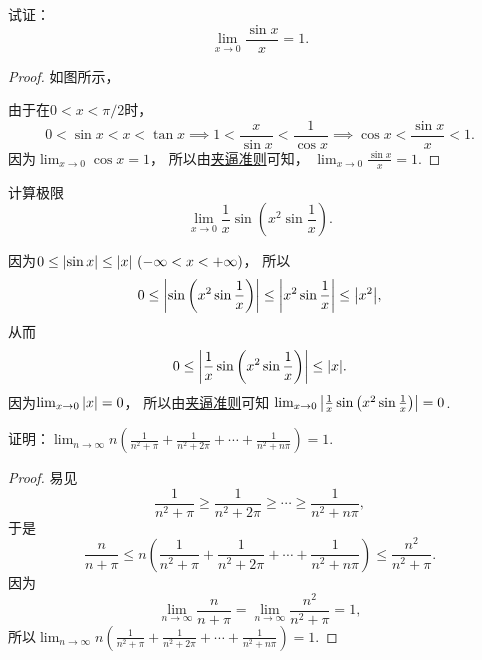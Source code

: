\begin{example}[重要极限I]
试证：\begin{equation}\label{equation:函数极限.重要极限1}
	\lim_{x\to0} \frac{\sin x}{x} = 1.
\end{equation}
\begin{proof}
如图所示，
\begin{center}
\end{center}
由于在\(0 < x < \pi/2\)时，\[
	0 < \sin x < x < \tan x
	\implies
	1 < \frac{x}{\sin x} < \frac{1}{\cos x}
	\implies
	\cos x < \frac{\sin x}{x} < 1.
\]
因为\(\lim_{x\to0}\cos x = 1\)，
所以由\hyperref[theorem:数列极限.夹逼准则]{夹逼准则}可知，
\(\lim_{x\to0} \frac{\sin x}{x} = 1\).
\end{proof}
\end{example}

\begin{example}
计算极限\[
	\lim_{x\to0} \frac1x \sin\left(x^2 \sin\frac1x\right).
\]
\begin{solution}
因为\(0\leq\abs{\sin x}\leq\abs{x}\ (-\infty<x<+\infty)\)，
所以\[
	0 \leq \abs{\sin\left(x^2 \sin\frac1x\right)}
	\leq \abs{x^2 \sin\frac1x}
	\leq \abs{x^2},
\]
从而\[
	0 \leq \abs{\frac1x \sin\left(x^2 \sin\frac1x\right)} \leq \abs{x}.
\]
因为\(\lim_{x\to0} \abs{x} = 0\)，
所以由\hyperref[theorem:数列极限.夹逼准则]{夹逼准则}可知
\(\lim_{x\to0} \abs{\frac1x \sin\left(x^2 \sin\frac1x\right)} = 0\).
\end{solution}
\end{example}

\begin{example}
证明：\(\lim_{n\to\infty} n \left(\frac1{n^2+\pi}+\frac1{n^2+2\pi}+\dotsb+\frac1{n^2+n\pi}\right)=1\).
\begin{proof}
易见\[
	\frac1{n^2+\pi}
	\geq \frac1{n^2+2\pi}
	\geq \dotsb
	\geq \frac1{n^2+n\pi},
\]
于是\[
	\frac{n}{n+\pi}
	\leq
	n \left(\frac1{n^2+\pi}+\frac1{n^2+2\pi}+\dotsb+\frac1{n^2+n\pi}\right)
	\leq
	\frac{n^2}{n^2+\pi}.
\]
因为\[
	\lim_{n\to\infty} \frac{n}{n+\pi}
	= \lim_{n\to\infty} \frac{n^2}{n^2+\pi}
	= 1,
\]
所以\(\lim_{n\to\infty} n \left(\frac1{n^2+\pi}+\frac1{n^2+2\pi}+\dotsb+\frac1{n^2+n\pi}\right)=1\).
\end{proof}
\end{example}

